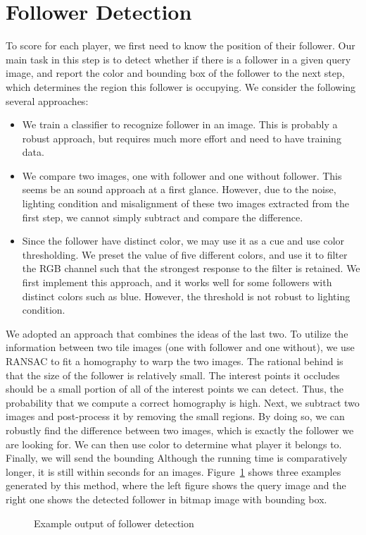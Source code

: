 \section{Follower Detection}
\label{sec:detect}
To score for each player, we first need to know the position of their follower.
Our main task in this step is to detect whether if there is a follower in 
a given query image, and report the color and bounding box of the follower
to the next step, which determines the region this follower is occupying.
We consider the following several approaches:
\begin{itemize}
\item 
We train a classifier to recognize follower in an image.
This is probably a robust approach, but requires much more effort and
need to have training data.
\item
We compare two images, one with follower and one without follower.
This seems be an sound approach at a first glance. However, due to the noise, lighting condition and misalignment of these two images extracted from the first step, we cannot simply subtract and compare the difference.
\item
Since the follower have distinct color, we may use it as a cue and use color thresholding. We preset the value of five different colors, and
use it to filter the RGB channel such that the strongest response to the filter
is retained. We first implement this approach, and it works well for some
followers with distinct colors such as blue.
However, the threshold is not robust to lighting condition.
\end{itemize}

We adopted an approach that combines the ideas of the last two. To utilize the
information between two tile images (one with follower and one without), we use
RANSAC to fit a homography to warp the two images. The rational behind is that
the size of the follower is relatively small. The interest points it occludes
should be a small portion of all of the interest points we can detect. Thus, the
probability that we compute a correct homography is high. Next, we subtract two
images and post-process it by removing the small regions. By doing so, we can
robustly find the difference between two images, which is exactly the follower we
are looking for. We can then use color to determine what player it belongs to.
Finally, we will send the bounding Although the running time is comparatively
longer, it is still within seconds for an images.
Figure~\ref{fig:follower} shows three examples generated by this
method, where the left figure shows the query image and the right one
shows the detected follower in bitmap image with bounding box.
\begin{figure}[hbt]
	\centering
{}
	\caption{Example output of follower detection}
	\label{fig:follower}
\end{figure}